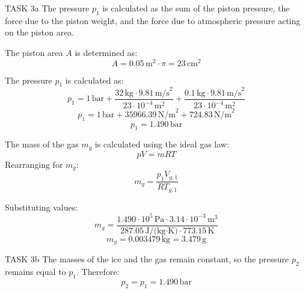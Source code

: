 TASK 3a  
The pressure \( p_1 \) is calculated as the sum of the piston pressure, the force due to the piston weight, and the force due to atmospheric pressure acting on the piston area.  

The piston area \( A \) is determined as:  
\[
A = 0.05 \, \text{m}^2 \cdot \pi = 23 \, \text{cm}^2
\]  

The pressure \( p_1 \) is calculated as:  
\[
p_1 = 1 \, \text{bar} + \frac{32 \, \text{kg} \cdot 9.81 \, \text{m/s}^2}{23 \cdot 10^{-4} \, \text{m}^2} + \frac{0.1 \, \text{kg} \cdot 9.81 \, \text{m/s}^2}{23 \cdot 10^{-4} \, \text{m}^2}
\]  
\[
p_1 = 1 \, \text{bar} + 35966.39 \, \text{N/m}^2 + 724.83 \, \text{N/m}^2
\]  
\[
p_1 = 1.490 \, \text{bar}
\]  

The mass of the gas \( m_g \) is calculated using the ideal gas law:  
\[
p V = m R T
\]  
Rearranging for \( m_g \):  
\[
m_g = \frac{p_1 V_{g,1}}{R T_{g,1}}
\]  

Substituting values:  
\[
m_g = \frac{1.490 \cdot 10^5 \, \text{Pa} \cdot 3.14 \cdot 10^{-3} \, \text{m}^3}{287.05 \, \text{J/(kg·K)} \cdot 773.15 \, \text{K}}
\]  
\[
m_g = 0.003479 \, \text{kg} = 3.479 \, \text{g}
\]  

TASK 3b  
The masses of the ice and the gas remain constant, so the pressure \( p_2 \) remains equal to \( p_1 \). Therefore:  
\[
p_2 = p_1 = 1.490 \, \text{bar}
\]